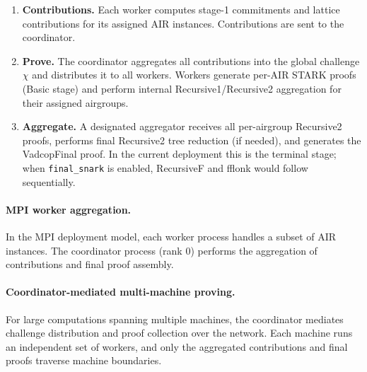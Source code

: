 \begin{enumerate}[label=\textbf{Phase \arabic*:}]
  \item \textbf{Contributions.}
        Each worker computes stage-1 commitments and
        lattice contributions for its assigned AIR instances.
        Contributions are sent to the coordinator.

  \item \textbf{Prove.}
        The coordinator aggregates all contributions
        into the global challenge $\chi$
        and distributes it to all workers.
        Workers generate per-AIR STARK proofs (Basic stage)
        and perform internal Recursive1/Recursive2 aggregation
        for their assigned airgroups.

  \item \textbf{Aggregate.}
        A designated aggregator receives all per-airgroup
        Recursive2 proofs, performs final Recursive2 tree reduction
        (if needed), and generates the VadcopFinal proof.
        In the current deployment this is the terminal stage;
        when \texttt{final\_snark} is enabled,
        RecursiveF and fflonk would follow sequentially.
\end{enumerate}

\paragraph{MPI worker aggregation.}
In the MPI deployment model, each worker process handles a subset
of AIR instances.
The coordinator process (rank 0) performs the aggregation
of contributions and final proof assembly.

\paragraph{Coordinator-mediated multi-machine proving.}
For large computations spanning multiple machines,
the coordinator mediates challenge distribution and proof collection
over the network.
Each machine runs an independent set of workers,
and only the aggregated contributions and final proofs
traverse machine boundaries.

